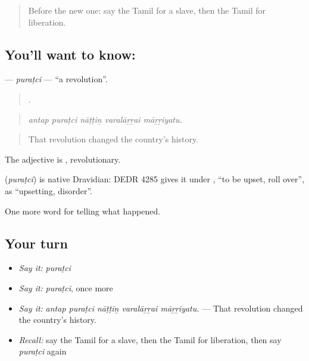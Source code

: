 \label{lesson:TA-C338-puratci}



\begin{quote}
Before the new one: say the Tamil for a slave, then the Tamil for liberation.
\end{quote}

\subsection*{You'll want to know: }
\textbf{} — \emph{puraṭci} — \textquotedblleft{}a revolution\textquotedblright{}.

\begin{quote}
    .
\end{quote}

\begin{quote}
\emph{antap puraṭci nāṭṭiṉ varalāṟṟai māṟṟiyatu.}
\end{quote}

\begin{quote}
That revolution changed the country's history.
\end{quote}

The adjective is , revolutionary.

\begin{cousinweb}
\textbf{} (\emph{puraṭci}) is native Dravidian: DEDR 4285 gives it under , \textquotedblleft{}to be upset, roll over\textquotedblright{}, as \textquotedblleft{}upsetting, disorder\textquotedblright{}.
\end{cousinweb}

\begin{grammarlens}[title={What you've built}]
One more word for telling what happened.
\end{grammarlens}

\subsection*{Your turn}
\begin{itemize}
\raggedright
  \item \emph{Say it:} \emph{puraṭci}
  \item \emph{Say it:} \emph{puraṭci}, once more
  \item \emph{Say it:} \emph{antap puraṭci nāṭṭiṉ varalāṟṟai māṟṟiyatu.} — That revolution changed the country's history.
  \item \emph{Recall:} say the Tamil for a slave, then the Tamil for liberation, then say \emph{puraṭci} again
\end{itemize}


